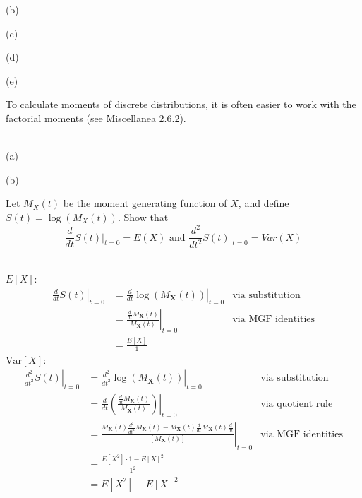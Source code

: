 \documentclass[12pt,letterpaper]{exam}
\begin{document}
\begin{questions}
\begin{solution}
		(b)
		
		
		(c)
		
		(d)
		
		(e)
		
		
	\end{solution}

	\setcounter{question}{28}
	\question To calculate moments of discrete distributions, it is often easier to work with the factorial moments (see Miscellanea 2.6.2). 
	
	\begin{solution} \\
		(a)
		
		(b)
		
	\end{solution}
	
	\setcounter{question}{31}
	\question  Let $M_X(t)$ be the moment generating function of $X$, and define $S(t) = \log{(M_X(t))}$. Show that
	$$ \frac{d}{dt} \left. S(t) \right|_{t=0} = E(X) \text{ and }  \frac{d^2}{dt^2} \left. S(t) \right|_{t=0} = Var(X)$$
	\begin{solution} \\
		\(E[X]\):
		\begin{align*}
			\left. \frac{d}{dt}S(t) \right|_{t=0} &= \left. \frac{d}{dt}\log(M_\mathbf{X}(t)) \right|_{t=0} &\text{via substitution}\\
			&= \left. \frac{\frac{d}{dt}M_\mathbf{X}(t)}{M_\mathbf{X}(t)} \right|_{t=0} &\text{via MGF identities} \\
			&= \frac{E[X]}{1}
		\end{align*}
		\(\text{Var}[X]\):
		\begin{align*}
			\left. \frac{d^2}{dt^2}S(t) \right|_{t=0} &= \left. \frac{d^2}{dt^2}\log(M_\mathbf{X}(t)) \right|_{t=0} &\text{via substitution}\\
			&= \left. \frac{d}{dt} \left( \frac{\frac{d}{dt}M_\mathbf{X}(t)}{M_\mathbf{X}(t)} \right) \right|_{t=0} &\text{via quotient rule} \\
			&= \left. \frac{
				M_\mathbf{X}(t)\frac{d^2}{dt^2} M_\mathbf{X}(t)-M_\mathbf{X}(t) \frac{d}{dt}M_\mathbf{X}(t) \frac{d}{dt} 
				}{ 
				\left[M_\mathbf{X}(t)\right] 
				} \right|_{t=0} &\text{via MGF identities} \\
			&= \frac{ E[X^2]\cdot1 - E[X]^2 }{ 1^2 } \\
			&= E[X^2] - E[X]^2
		\end{align*}
		

\end{solution}
\end{questions}
\end{document}
